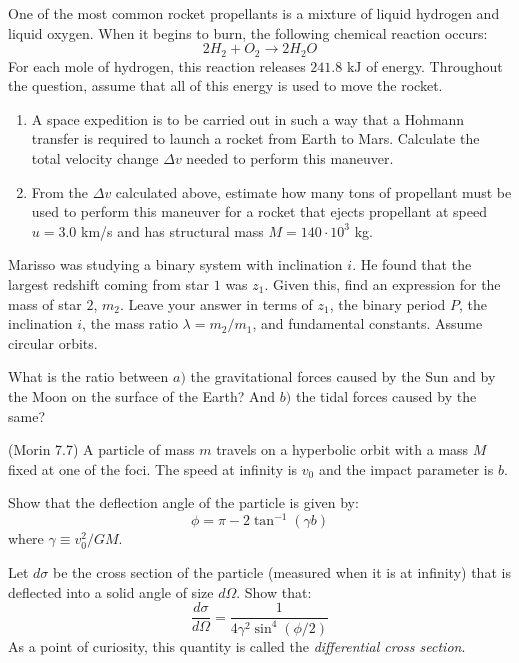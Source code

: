\documentclass[11pt]{article}
\begin{document}
\begin{pproblem} One of the most common rocket propellants is a mixture of liquid hydrogen and liquid oxygen. When it begins to burn, the following chemical reaction occurs:
    \[
    2H_2 + O_2 \rightarrow 2H_2O
    \] 
    For each mole of hydrogen, this reaction releases \(241.8 \text{ kJ}\) of energy. Throughout the question, assume that all of this energy is used to move the rocket.
    \begin{enumerate}[label=\textbf{\alph*)}]
        \item A space expedition is to be carried out in such a way that a Hohmann transfer is required to launch a rocket from Earth to Mars. Calculate the total velocity change \(\Delta v\) needed to perform this maneuver.
        \item From the \(\Delta v\) calculated above, estimate how many tons of propellant must be used to perform this maneuver for a rocket that ejects propellant at speed \(u = 3.0\) km/s and has structural mass \(M = 140\cdot10^3\) kg.
    \end{enumerate}
    
\end{pproblem}

\begin{pproblem} Marisso was studying a binary system with inclination \(i\). He found that the largest redshift coming from star \(1\) was \(z_1\). Given this, find an expression for the mass of star \(2\), \(m_2\). Leave your answer in terms of \(z_1\), the binary period \(P\), the inclination \(i\), the mass ratio \(\lambda  = m_2/m_1\), and fundamental constants. Assume circular orbits.
    
\end{pproblem}

\begin{pproblem} What is the ratio between \(a)\) the gravitational forces caused by the Sun and by the Moon on the surface of the Earth? And \(b)\) the tidal forces caused by the same?
    
\end{pproblem}

\begin{pproblem} (Morin 7.7) A particle of mass \(m\) travels on a hyperbolic orbit with a mass \(M\) fixed at one of the foci. The speed at infinity is \(v_0\) and the impact parameter is \(b\).
    \begin{alternativas}
    \item Show that the deflection angle of the particle is given by:
    \[
    \phi = \pi-2\tan^{-1}(\gamma b)
    \]
    where \(\gamma \equiv v_0^2/GM\).
    \item Let \(d\sigma\) be the cross section of the particle (measured when it is at infinity) that is deflected into a solid angle of size \(d\Omega\). Show that:
    \[
    \frac{d\sigma}{d\Omega} = \frac{1}{4\gamma^2\sin^4(\phi/2)}
    \] 
    As a point of curiosity, this quantity is called the \textit{differential cross section}.
    \end{alternativas}

    
\end{pproblem}
\end{document}
